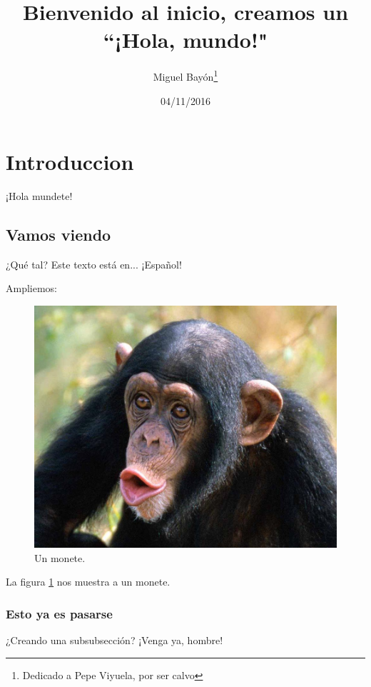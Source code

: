 \documentclass[12pt]{article}%
\title{\textbf{\Huge Bienvenido al inicio, creamos un ``¡Hola, mundo!"}}%
\date{04/11/2016}
\author{Miguel Bayón\thanks{Dedicado a Pepe Viyuela, por ser calvo}}
\begin{document}
	\maketitle%
	\thispagestyle{empty}
	\clearpage%
	
	\tableofcontents%
	\thispagestyle{empty}
	\clearpage
	
	\setcounter{page}{1}%

	\section{Introduccion}
		¡Hola mundete!
	\subsection{Vamos viendo}
		¿Qué tal? Este texto está en... ¡Español!
		
		Ampliemos:
		\begin{figure}[h]%
			\includegraphics[width=\linewidth]{chimpances}%
			\caption{Un monete.}
			\label{fig:monete1}
		\end{figure}
		
		La figura \ref{fig:monete1} nos muestra a un monete.
	\subsubsection{Esto ya es pasarse}
		¿Creando una subsubsección? ¡Venga ya, hombre!
\end{document}
